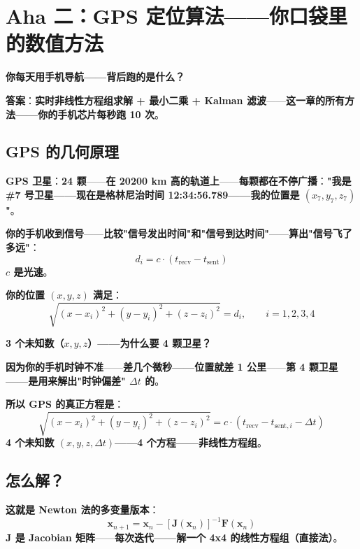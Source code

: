 \section{Aha 二：GPS 定位算法——你口袋里的数值方法}

\textbf{你每天用手机导航——背后跑的是什么？}

\textbf{答案}：\textbf{实时非线性方程组求解 + 最小二乘 + Kalman 滤波}——\textbf{这一章的所有方法——你的手机芯片每秒跑 10 次}。

\subsection{GPS 的几何原理}

\textbf{GPS 卫星}：\textbf{24 颗}——\textbf{在 20200 km 高的轨道上}——\textbf{每颗都在不停广播}：\textbf{"我是 \#7 号卫星——现在是格林尼治时间 12:34:56.789——我的位置是 $(x_7, y_7, z_7)$"}。

\textbf{你的手机收到信号}——\textbf{比较"信号发出时间"和"信号到达时间"}——\textbf{算出"信号飞了多远"}：
\begin{equation}
d_i = c \cdot (t_{\text{recv}} - t_{\text{sent}})
\end{equation}
\textbf{$c$ 是光速}。

\textbf{你的位置 $(x, y, z)$ 满足}：
\begin{equation}
\sqrt{(x - x_i)^2 + (y - y_i)^2 + (z - z_i)^2} = d_i, \qquad i = 1, 2, 3, 4
\end{equation}

\textbf{3 个未知数（$x, y, z$）——为什么要 4 颗卫星？}

\textbf{因为你的手机时钟不准}——\textbf{差几个微秒——位置就差 1 公里}——\textbf{第 4 颗卫星——是用来解出"时钟偏差" $\Delta t$ 的}。

\textbf{所以 GPS 的真正方程是}：
\begin{equation}
\sqrt{(x - x_i)^2 + (y - y_i)^2 + (z - z_i)^2} = c \cdot (t_{\text{recv}} - t_{\text{sent},i} - \Delta t)
\end{equation}
\textbf{4 个未知数 $(x, y, z, \Delta t)$——4 个方程——非线性方程组}。

\subsection{怎么解？}

\textbf{这就是 Newton 法的多变量版本}：
\begin{equation}
\bm{x}_{n+1} = \bm{x}_n - [\bm{J}(\bm{x}_n)]^{-1} \bm{F}(\bm{x}_n)
\end{equation}
\textbf{$\bm{J}$ 是 Jacobian 矩阵}——\textbf{每次迭代——解一个 4x4 的线性方程组（直接法）}。

